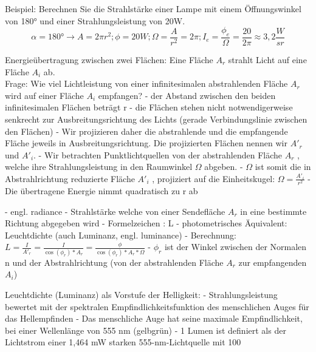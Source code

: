 \documentclass[10pt,landscape]{article}
\begin{document}
\begin{multicols}{3}
  Beispiel: Berechnen Sie die Strahlstärke einer Lampe mit einem Öffnungswinkel von 180° und einer Strahlungsleistung von 20W.
  $$\alpha=180°\rightarrow A=2\pi r^2; \phi =20W; \Omega=\frac{A}{r^2}=2\pi ; I_e=\frac{\phi_e}{\Omega}=\frac{20}{2\pi}\approx 3,2 \frac{W}{sr}$$
  
  Energieübertragung zwischen zwei Flächen:
  Eine Fläche $A_r$ strahlt Licht auf eine Fläche $A_i$ ab.\\
  Frage: Wie viel Lichtleistung von einer infinitesimalen abstrahlenden Fläche $A_r$ wird auf einer Fläche $A_i$ empfangen?
  - der Abstand zwischen den beiden infinitesimalen Flächen beträgt r
  - die Flächen stehen nicht notwendigerweise senkrecht zur Ausbreitungsrichtung des Lichts (gerade Verbindungslinie zwischen den Flächen)
  - Wir projizieren daher die abstrahlende und die empfangende Fläche jeweils in Ausbreitungsrichtung. Die projizierten Flächen nennen wir $A'_r$ und $A'_i$.
  - Wir betrachten Punktlichtquellen von der abstrahlenden Fläche $A_r$ , welche ihre Strahlungsleistung in den Raumwinkel $\Omega$ abgeben.
  - $\Omega$ ist somit die in Abstrahlrichtung reduzierte Fläche $A'_i$ , projiziert auf die Einheitskugel: $\Omega=\frac{A'_i}{r^2}$
  - Die übertragene Energie nimmt quadratisch zu r ab
  
  - engl. radiance
  - Strahlstärke welche von einer Sendefläche $A_r$ in eine bestimmte Richtung abgegeben wird
  - Formelzeichen : L
  - photometrisches Äquivalent: Leuchtdichte (auch Luminanz, engl. luminance)
  - Berechnung: $L = \frac{I}{A'_r}=\frac{I}{\cos(\phi_r)*A_r} = \frac{\phi}{\cos(\phi_r)*A_r*\Omega}$
  - $\phi_r$ ist der Winkel zwischen der Normalen n und der Abstrahlrichtung (von der abstrahlenden Fläche $A_r$ zur empfangenden $A_i$)
  
  Leuchtdichte (Luminanz) als Vorstufe der Helligkeit:
  - Strahlungsleistung bewertet mit der spektralen Empfindlichkeitsfunktion des menschlichen Auges für das Hellempfinden
  - Das menschliche Auge hat seine maximale Empfindlichkeit, bei einer Wellenlänge von 555 nm (gelbgrün)
  - 1 Lumen ist definiert als der Lichtstrom einer 1,464 mW starken 555-nm-Lichtquelle mit 100%
  

\end{multicols}
\end{document}
